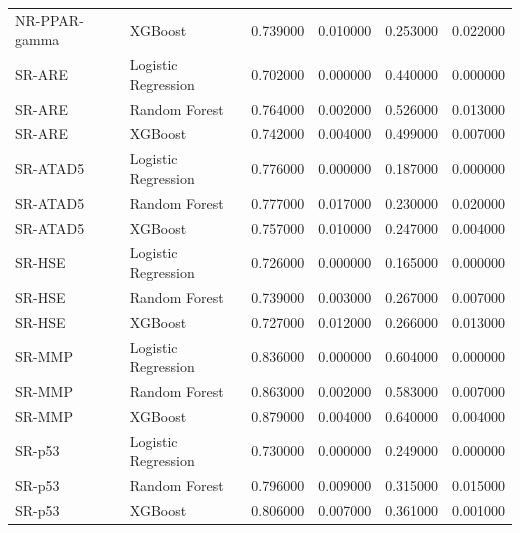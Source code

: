 \begin{table}
\begin{tabular}{llrrrr}
NR-PPAR-gamma & XGBoost & 0.739000 & 0.010000 & 0.253000 & 0.022000 \\
SR-ARE & Logistic Regression & 0.702000 & 0.000000 & 0.440000 & 0.000000 \\
SR-ARE & Random Forest & 0.764000 & 0.002000 & 0.526000 & 0.013000 \\
SR-ARE & XGBoost & 0.742000 & 0.004000 & 0.499000 & 0.007000 \\
SR-ATAD5 & Logistic Regression & 0.776000 & 0.000000 & 0.187000 & 0.000000 \\
SR-ATAD5 & Random Forest & 0.777000 & 0.017000 & 0.230000 & 0.020000 \\
SR-ATAD5 & XGBoost & 0.757000 & 0.010000 & 0.247000 & 0.004000 \\
SR-HSE & Logistic Regression & 0.726000 & 0.000000 & 0.165000 & 0.000000 \\
SR-HSE & Random Forest & 0.739000 & 0.003000 & 0.267000 & 0.007000 \\
SR-HSE & XGBoost & 0.727000 & 0.012000 & 0.266000 & 0.013000 \\
SR-MMP & Logistic Regression & 0.836000 & 0.000000 & 0.604000 & 0.000000 \\
SR-MMP & Random Forest & 0.863000 & 0.002000 & 0.583000 & 0.007000 \\
SR-MMP & XGBoost & 0.879000 & 0.004000 & 0.640000 & 0.004000 \\
SR-p53 & Logistic Regression & 0.730000 & 0.000000 & 0.249000 & 0.000000 \\
SR-p53 & Random Forest & 0.796000 & 0.009000 & 0.315000 & 0.015000 \\
SR-p53 & XGBoost & 0.806000 & 0.007000 & 0.361000 & 0.001000 \\
\bottomrule
\end{tabular}
\end{table}
